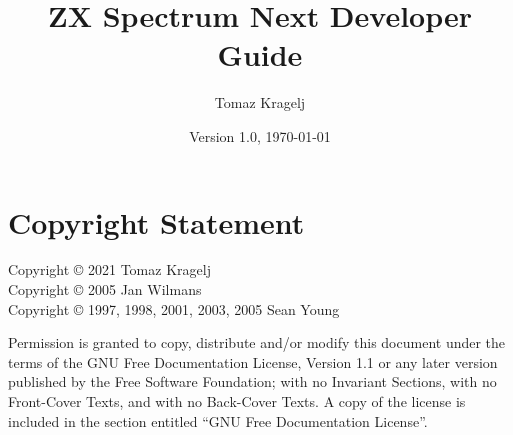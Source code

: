 \documentclass[twoside,openright,a4paper]{book}
\begin{document}
\frontmatter


\title{ZX Spectrum Next Developer Guide}
\author{Tomaz Kragelj}
\date{Version 1.0, \today}

\maketitle




\chapter*{Copyright Statement}

Copyright {\copyright} 2021 Tomaz Kragelj\\
Copyright {\copyright} 2005 Jan Wilmans\\
Copyright {\copyright} 1997, 1998, 2001, 2003, 2005 Sean Young

Permission is granted to copy, distribute and/or modify this document under the terms of the GNU Free Documentation License, Version 1.1 or any later version published by the Free Software Foundation; with no Invariant Sections, with no Front-Cover Texts, and with no Back-Cover Texts. A copy of the license is included in the section entitled ``GNU Free Documentation License''.



\setcounter{page}{0}
\pagestyle{clean}


\setcounter{tocdepth}{1}
\dominitoc \tableofcontents

\noptcrule
\nomtcrule									%
\renewcommand{\mtcoffset}{-1.5em}			%
\def\mtcSfont{\normalsize}
\def\mtcSSfont{\small}



\mainmatter
\end{document}
